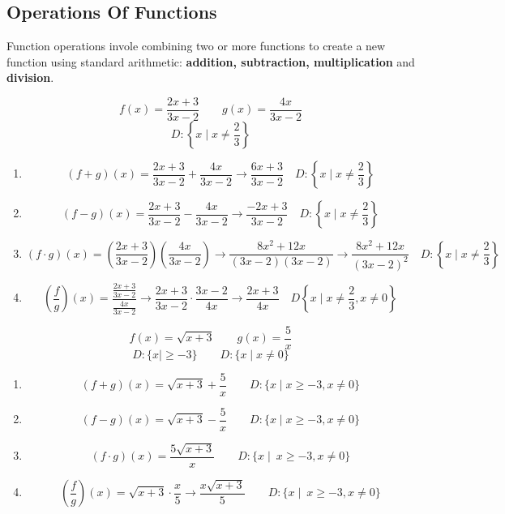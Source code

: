 \subsection{Operations Of Functions}
\begin{definition}
  Function operations invole combining two or more functions to create a new function using standard arithmetic: \textbf{addition, subtraction, multiplication} and \textbf{division}.
\end{definition}
\begin{example}[Operations]
  \hfill
  $$f(x) = \frac{2x + 3}{3x - 2} \qquad g(x) = \frac{4x}{3x - 2}$$
  $$D: \left\{x \mid x \ne \frac{2}{3}\right\} $$
  \begin{enumerate}
  \item $$(f + g)(x) = \frac{2x + 3}{3x - 2} + \frac{4x}{3x - 2} \to \frac{6x + 3}{3x-2} \quad D: \left\{x \mid x \ne \frac{2}{3}\right\}$$
  \item $$(f - g)(x) = \frac{2x + 3}{3x - 2} - \frac{4x}{3x - 2} \to \frac{-2x + 3}{3x - 2} \quad D: \left\{x \mid x \ne \frac{2}{3}\right\}$$
  \item $$(f \cdot g)(x) = \left(\frac{2x + 3}{3x - 2}\right)\left(\frac{4x}{3x - 2}\right) \to \frac{8x^2 + 12x}{(3x - 2)(3x - 2)} \to \frac{8x^2 + 12x}{(3x - 2)^2} \quad D: \left\{x \mid x \ne \frac{2}{3}\right\}$$
  \item $$\left(\frac{f}{g}\right)(x) = \frac{\frac{2x + 3}{3x - 2}}{\frac{4x}{3x - 2}} \to \frac{2x + 3}{3x - 2} \cdot \frac{3x - 2}{4x} \to \frac{2x + 3}{4x} \quad D \left\{x \mid x \ne \frac{2}{3}, x \ne 0\right\}$$
  \end{enumerate}
\end{example}

\begin{example}
  \hfill
  $$f(x) = \sqrt{x + 3} \qquad g(x)=\frac{5}{x}$$
  $$D: \{x \mid \ge -3 \} \qquad D: \{x \mid x \ne 0\}$$
  \begin{enumerate}
  \item $$(f + g)(x) = \sqrt{x + 3} + \frac{5}{x} \qquad D: \{x \mid x \ge -3, x \ne 0\}$$
  \item $$(f - g)(x) = \sqrt{x + 3} - \frac{5}{x}\qquad D: \{x \mid x \ge -3, x \ne 0\}$$
  \item $$(f \cdot g)(x) = \frac{5 \sqrt{x + 3}}{x}\qquad D: \{x \mid\ x \ge -3, x \ne 0\}$$
  \item $$\left(\frac{f}{g}\right)(x) = \sqrt{x + 3} \cdot \frac{x}{5} \to \frac{x\sqrt{x + 3}}{5} \qquad D: \{x \mid\ x \ge -3, x \ne 0\}$$
  \end{enumerate}
\end{example}
